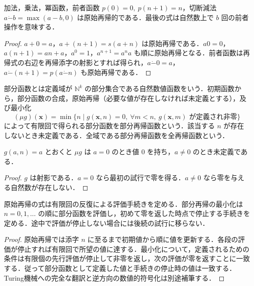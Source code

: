 \begin{prop}[初等算術の原始再帰表示]
加法，乗法，冪函数，前者函数 $p(0)=0,\ p(n+1)=n$，切断減法 $a\mathbin{\dot-}b=\max(a-b,0)$ は原始再帰的である．最後の式は自然数上で $b$ 回の前者操作を意味する．
\end{prop}
\begin{proof}
$a+0=a$，$a+(n+1)=s(a+n)$ は原始再帰である．$a0=0$，$a(n+1)=an+a$，$a^0=1$，$a^{n+1}=a^na$ も順に原始再帰となる．前者函数は再帰式の右辺を再帰添字の射影とすれば得られ，$a\mathbin{\dot-}0=a$，$a\mathbin{\dot-}(n+1)=p(a\mathbin{\dot-}n)$ も原始再帰である．
\end{proof}
\begin{defn}[部分再帰函数]
部分函数とは定義域が $\mathbb N^k$ の部分集合である自然数値函数をいう．初期函数から，部分函数の合成，原始再帰（必要な値が存在しなければ未定義とする），及び最小化
\[
(\mu g)(\mathbf x)=\min\{n\mid g(\mathbf x,n)=0,\ \forall m<n,\ g(\mathbf x,m)\text{ が定義され非零}\}
\]
によって有限回で得られる部分函数を部分再帰函数という．該当する $n$ が存在しないとき未定義である．全域である部分再帰函数を全再帰函数という．
\end{defn}
\begin{prop}[最小化と未定義性]
$g(a,n)=a$ とおくと $\mu g$ は $a=0$ のとき値 $0$ を持ち，$a\ne0$ のとき未定義である．
\end{prop}
\begin{proof}
$g$ は射影である．$a=0$ なら最初の試行で零を得る．$a\ne0$ なら零を与える自然数が存在しない．
\end{proof}
\begin{prop}[原始再帰と最小化の手続き]
原始再帰の式は有限回の反復による評価手続きを定める．部分再帰の最小化は $n=0,1,\ldots$ の順に部分函数を評価し，初めて零を返した時点で停止する手続きを定める．途中で評価が停止しない場合には後続の試行に移らない．
\end{prop}
\begin{proof}
原始再帰では添字 $n$ に至るまで初期値から順に値を更新する．各段の評価が停止すれば有限回で所望の値に達する．最小化について，定義されるための条件は有限個の先行評価が停止して非零を返し，次の評価が零を返すことに一致する．従って部分函数として定義した値と手続きの停止時の値は一致する．Turing機械への完全な翻訳と逆方向の数値的符号化は別途補筆する．
\end{proof}
